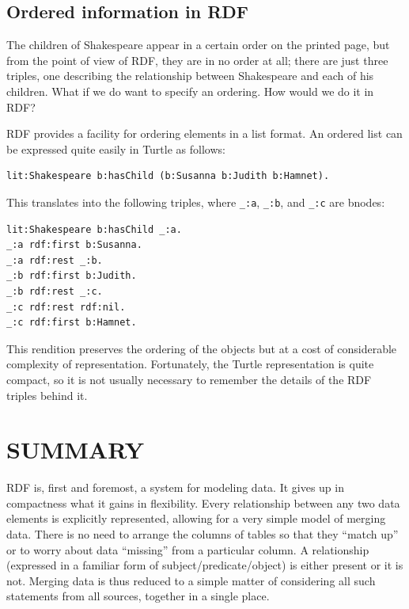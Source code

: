 \subsection{Ordered information in RDF}

The children of Shakespeare appear in a certain order on the printed
page, but from the point of view of RDF, they are in no order at all;
there are just three triples, one describing the relationship between
Shakespeare and each of his children. What if we do want to specify an
ordering. How would we do it in RDF?

RDF provides a facility for ordering elements in a list format. An
ordered list can be expressed quite easily in Turtle as follows:

\begin{lstlisting}
lit:Shakespeare b:hasChild (b:Susanna b:Judith b:Hamnet).
\end{lstlisting}

This translates into the following triples, where \texttt{\_:a}, \texttt{\_:b}, and \texttt{\_:c}
are bnodes:

\begin{lstlisting}
lit:Shakespeare b:hasChild _:a.
_:a rdf:first b:Susanna.
_:a rdf:rest _:b.
_:b rdf:first b:Judith.
_:b rdf:rest _:c.
_:c rdf:rest rdf:nil.
_:c rdf:first b:Hamnet.
\end{lstlisting}

This rendition preserves the ordering of the objects but at a cost of
considerable complexity of representation. Fortunately, the Turtle
representation is quite compact, so it is not usually necessary to
remember the details of the RDF triples behind it.

\section{SUMMARY}

RDF is, first and foremost, a system for modeling data. It gives up in
compactness what it gains in flexibility. Every relationship between any
two data elements is explicitly represented, allowing for a very simple
model of merging data. There is no need to arrange the columns of tables
so that they ``match up'' or to worry about data ``missing'' from a
particular column. A relationship (expressed in a familiar form of
subject/predicate/object) is either present or it is not. Merging data
is thus reduced to a simple matter of considering all such statements
from all sources, together in a single place.

